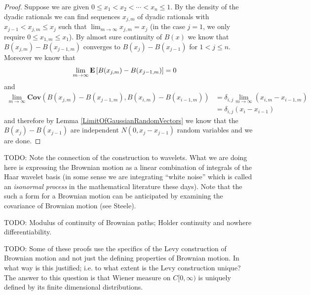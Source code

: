 \begin{proof}
Suppose we are given $0 \leq x_1 < x_2 < \cdots < x_n \leq 1$.  By the
density of the dyadic rationals we can find sequences $x_{j,m}$ of
dyadic rationals with $x_{j-1} < x_{j,m} \leq x_j$ such that $\lim_{m
  \to \infty} x_{j,m}= x_j$ (in the case $j=1$, we only require $0
\leq x_{1,m} \leq x_1$).  By almost sure continuity of $B(x)$ we know
that $B(x_{j,m}) - B(x_{j-1,m})$ converges to $B(x_j) - B(x_{j-1})$
for $1 < j \leq n$.  Moreover we know that 
\begin{align*}
\lim_{m \to \infty} \textbf{E}\left[B(x_{j,m}) - B(x_{j-1,m})\right] &= 0
\end{align*}
and 
\begin{align*}
\lim_{m \to \infty} \textbf{Cov}\left ( B(x_{j,m}) - B(x_{j-1,m}), B(x_{i,m})
  - B(x_{i-1,m}) \right) &= \delta_{i,j} \lim_{m \to \infty} (x_{i,m} -
x_{i-1,m}) \\
&= \delta_{i,j}  (x_i - x_{i-1})
\end{align*}
and therefore by Lemma \ref{LimitOfGaussianRandomVectors} we know that
the $B(x_j) - B(x_{j-1})$ are independent $N(0, x_j - x_{j-1})$ random
variables and we are done.
\end{proof}
TODO: Note the connection of the construction to wavelets.  What we
are doing here is expressing the Brownian motion as a linear
combination of integrals of the Haar wavelet basis (in some sense we
are integrating ``white noise'' which is called an \emph{isonormal
  process} in the mathematical literature these days).  Note that the
such a form for a Brownian motion can be anticipated by examining the
covariance of Brownian motion (see Steele).

TODO: Modulus of continuity of Brownian paths; Holder continuity and
nowhere differentiability.

TODO: Some of these proofs use the specifics of the Levy construction
of Brownian motion and not just the defining properties of Brownian
motion.  In what way is this justified; i.e. to what extent is the
Levy construction unique?  The answer to this question is that Wiener
measure on $C[0,\infty)$ is uniquely defined by its finite dimensional
distributions.

